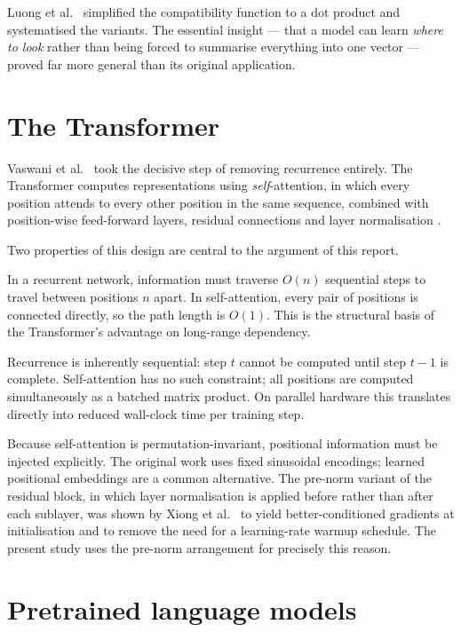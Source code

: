 Luong et al.\ \cite{luong2015} simplified the compatibility function to a dot product and
systematised the variants. The essential insight --- that a model can learn \emph{where to look}
rather than being forced to summarise everything into one vector --- proved far more general than
its original application.

\section{The Transformer}

Vaswani et al.\ \cite{vaswani2017} took the decisive step of removing recurrence entirely. The
Transformer computes representations using \emph{self}-attention, in which every position attends
to every other position in the same sequence, combined with position-wise feed-forward layers,
residual connections and layer normalisation \cite{ba2016}.

Two properties of this design are central to the argument of this report.

 In a recurrent network, information must traverse $O(n)$
sequential steps to travel between positions $n$ apart. In self-attention, every pair of positions
is connected directly, so the path length is $O(1)$. This is the structural basis of the
Transformer's advantage on long-range dependency.

 Recurrence is inherently sequential: step $t$ cannot be computed until step
$t-1$ is complete. Self-attention has no such constraint; all positions are computed
simultaneously as a batched matrix product. On parallel hardware this translates directly into
reduced wall-clock time per training step.

Because self-attention is permutation-invariant, positional information must be injected
explicitly. The original work uses fixed sinusoidal encodings; learned positional embeddings are a
common alternative. The pre-norm variant of the residual block, in which layer normalisation is
applied before rather than after each sublayer, was shown by Xiong et al.\ \cite{xiong2020} to
yield better-conditioned gradients at initialisation and to remove the need for a learning-rate
warmup schedule. The present study uses the pre-norm arrangement for precisely this reason.

\section{Pretrained language models}

